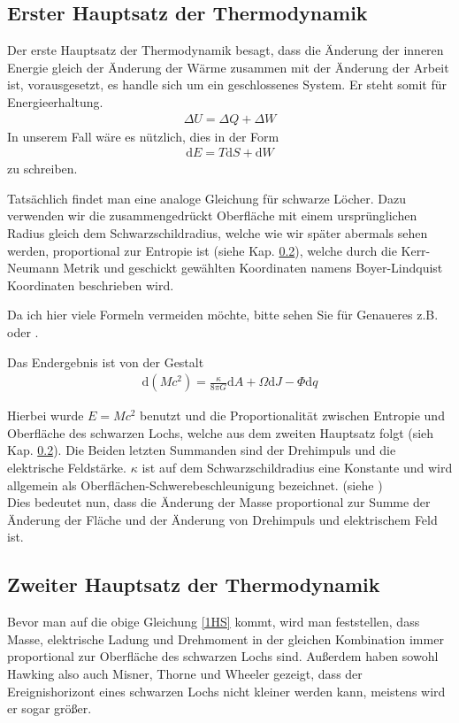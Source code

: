 \documentclass[ngerman]{scrartcl}
\newcommand{\diff}{\mathrm{d}}
\begin{document}
	\subsection{Erster Hauptsatz der Thermodynamik}
	Der erste Hauptsatz der Thermodynamik besagt, dass die Änderung der inneren Energie gleich der Änderung der Wärme zusammen mit der Änderung der Arbeit ist, vorausgesetzt, es handle sich um ein geschlossenes System. Er steht somit für Energieerhaltung.
		\begin{align}
			\Delta U = \Delta Q + \Delta W
		\end{align}
	In unserem Fall wäre es nützlich, dies in der Form
		\begin{align}
			\diff E = T\diff S + \diff W
		\end{align}
	zu schreiben. 
	
	Tatsächlich findet man eine analoge Gleichung für schwarze Löcher.
	Dazu verwenden wir die zusammengedrückt Oberfläche mit einem ursprünglichen Radius gleich dem Schwarzschildradius, welche wie wir später abermals sehen werden, proportional zur Entropie ist (siehe Kap. \ref{zweiterHS}), welche durch die Kerr-Neumann Metrik und geschickt gewählten Koordinaten namens Boyer-Lindquist Koordinaten beschrieben wird. 
	
	Da ich hier viele Formeln vermeiden möchte, bitte sehen Sie für Genaueres z.B. \cite{BekensteinHawking} oder \cite{Gebhardt}.
	
	Das Endergebnis ist von der Gestalt
		\begin{align} \label{1HS}
			\diff (Mc^2) = \frac{\kappa}{8 \pi G} \diff A + \Omega \diff J - \Phi \diff q
		\end{align} 
	
	Hierbei wurde $E = Mc^2$ benutzt und die Proportionalität zwischen Entropie und Oberfläche des schwarzen Lochs, welche aus dem zweiten Hauptsatz folgt (sieh Kap. \ref{zweiterHS}). Die Beiden letzten Summanden sind der Drehimpuls und die elektrische Feldstärke. $\kappa$ ist auf dem Schwarzschildradius eine Konstante und wird allgemein als Oberflächen-Schwerebeschleunigung bezeichnet. (siehe \cite{Gebhardt})
	\\
	
	Dies bedeutet nun, dass die Änderung der Masse proportional zur Summe der Änderung der Fläche und der Änderung von Drehimpuls und elektrischem Feld ist.

\subsection{Zweiter Hauptsatz der Thermodynamik} \label{zweiterHS}
	Bevor man auf die obige Gleichung \ref{1HS} kommt, wird man feststellen, dass Masse, elektrische Ladung und Drehmoment in der gleichen Kombination immer proportional zur Oberfläche des schwarzen Lochs sind. 
	Außerdem haben sowohl Hawking \cite{ParticleCreation} also auch Misner, Thorne und Wheeler \cite{MisnerThorneWheeler} gezeigt, dass der Ereignishorizont eines schwarzen Lochs nicht kleiner werden kann, meistens wird er sogar größer. 
	
\end{document}
